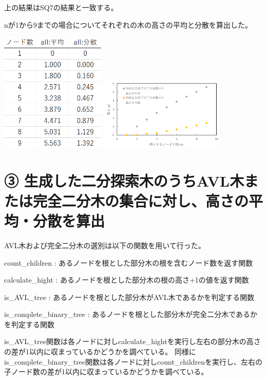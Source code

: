 \documentclass{ltjsarticle}
\begin{document}
上の結果はSQ7の結果と一致する。

nが1から9までの場合についてそれぞれの木の高さの平均と分散を算出した。

\begin{center}
\includegraphics[width=5cm]{all_t.png}
\includegraphics[width=6cm]{all_g.png}
\end{center}

\section{➂ 生成した二分探索木のうちAVL木または完全二分木の集合に対し、高さの平均・分散を算出}

AVL木および完全二分木の選別は以下の関数を用いて行った。

\begin{list}{}{\leftmargin=1em}
  \item count\_children : あるノードを根とした部分木の根を含むノード数を返す関数
  \item calculate\_hight : あるノードを根とした部分木の根の高さ+1の値を返す関数
  \item is\_AVL\_tree : あるノードを根とした部分木がAVL木であるかを判定する関数
  \item is\_complete\_binary\_tree : あるノードを根とした部分木が完全二分木であるかを判定する関数
\end{list}

is\_AVL\_tree関数は各ノードに対しcalculate\_hightを実行し左右の部分木の高さの差が1以内に収まっているかどうかを調べている。
同様にis\_complete\_binary\_tree関数は各ノードに対しcount\_childrenを実行し、左右の子ノード数の差が1以内に収まっているかどうかを調べている。
\end{document}
